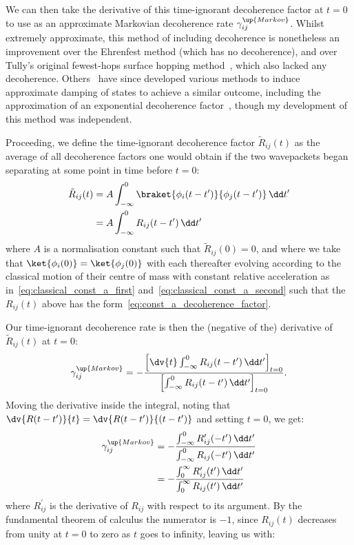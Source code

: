 We can then take the derivative of this time-ignorant decoherence factor at $t=0$ to use as an approximate Markovian decoherence rate $\gamma_{ij}^\up{Markov}$. Whilst extremely approximate, this method of including decoherence is nonetheless an improvement over the Ehrenfest method (which has no decoherence), and over Tully's original fewest-hops surface hopping method~\cite{doi:10.1063/1.459170}, which also lacked any decoherence. Others~\cite{doi:10.1063/1.4733675, doi:10.1063/1.1468887, doi:10.1063/1.470177} have since developed various methods to induce approximate damping of states to achieve a similar outcome, including the approximation of an exponential decoherence factor~\cite{doi:10.1063/1.4733675}, though my development of this method was independent.

Proceeding, we define the time-ignorant decoherence factor $\tilde R_{ij}(t)$ as the average of all decoherence factors one would obtain if the two wavepackets began separating at some point in time before $t=0$:
\begin{align}
\tilde R_{ij}(t) &= A\int_{-\infty}^0\braket{\phi_i(t-t^\prime)}{\phi_j(t - t^\prime)} \,\dd t^\prime\\
&= A\int_{-\infty}^0 R_{ij}(t-t^\prime) \,\dd t^\prime
\end{align}
where $A$ is a normalisation constant such that $\tilde R_{ij}(0) = 0$, and where we take that $\ket{\phi_i(0)} = \ket{\phi_j(0)}$ with each thereafter evolving according to the classical motion of their centre of mass with constant relative acceleration as in~\eqref{eq:classical_const_a_first} and~\eqref{eq:classical_const_a_second} such that the $R_{ij}(t)$ above has the form~\eqref{eq:const_a_decoherence_factor}.

Our time-ignorant decoherence rate is then the (negative of the) derivative of $\tilde R_{ij}(t)$ at $t=0$:
\begin{align}
\gamma_{ij}^\up{Markov} = -\frac{\left[\dv{t}\int_{-\infty}^0 R_{ij}(t-t^\prime) \,\dd t^\prime\right]_{t=0} }
{\left[\int_{-\infty}^0 R_{ij}(t-t^\prime) \,\dd t^\prime\right]_{t=0}}.
\end{align}
Moving the derivative inside the integral, noting that $\dv{R(t - t^\prime)}{t} = \dv{R(t - t^\prime)}{(t - t^\prime)}$ and setting $t = 0$, we get:
\begin{align}
\gamma_{ij}^\up{Markov} &= -\frac
{\int_{-\infty}^0 R_{ij}^\prime(-t^\prime) \,\dd t^\prime}
{\int_{-\infty}^0 R_{ij}(-t^\prime) \,\dd t^\prime}\\
&= -\frac
{\int_0^\infty R_{ij}^\prime(t^\prime) \,\dd t^\prime}
{\int_0^\infty R_{ij}(t^\prime) \,\dd t^\prime}
\end{align}
where $R_{ij}^\prime$ is the derivative of $R_{ij}$ with respect to its argument. By the fundamental theorem of calculus the numerator is $-1$, since $R_{ij}(t)$ decreases from unity at $t=0$ to zero as $t$ goes to infinity, leaving us with:

